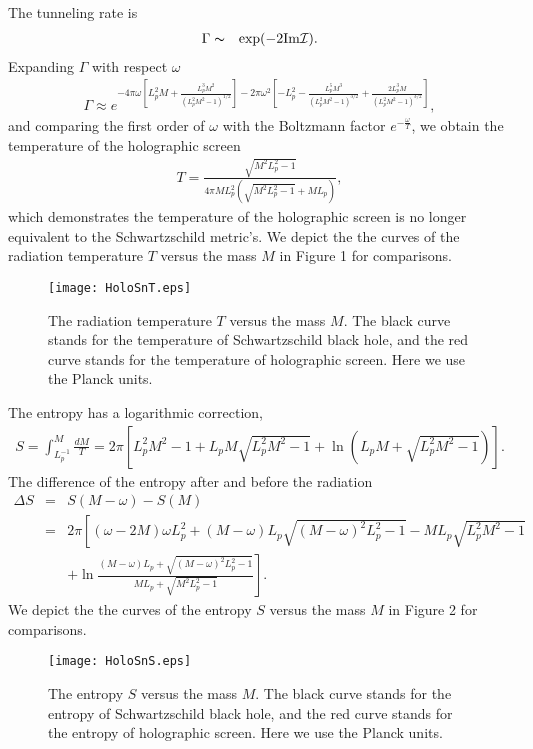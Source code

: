 \documentclass[12pt]{article}
\begin{document}
The tunneling rate is
\begin{eqnarray}
\Gamma  &\thicksim& \exp(-2 {\rm Im}{\cal I}).
 \end{eqnarray}
Expanding $\Gamma$ with respect $\omega$
\begin{eqnarray}
\Gamma  \approx   e^{-4\pi \omega \left[ L_p^2 M+\frac{ L_p^3 M^2}{\left(L_p^2 M^2-1\right)^{1/2}}\right]-2\pi  \omega^2 \left[-L_p^2-\frac{L_p^5 M^3}{\left(L_p^2 M^2-1\right)^{3/2}}+\frac{2 L_p^3 M}{\left(L_p^2 M^2-1\right)^{3/2}}\right]},
\end{eqnarray}
and comparing the first order of $\omega$ with the Boltzmann factor $e^{-\frac{\omega}{T}}$, we obtain the temperature of the holographic screen
\begin{eqnarray}
T=\frac{\sqrt{M^2 L_p^2 - 1}}{4 \pi M L_p^2 \left(\sqrt{M^2 L_p^2 - 1}+M L_p \right)},
\end{eqnarray}
which  demonstrates the temperature of the holographic screen is no longer equivalent to the Schwartzschild metric's.
We depict the the curves of the radiation temperature $T$ versus the mass $M$ in Figure 1 for comparisons.
\begin{figure}[htbp]
\begin{center}
\texttt{[image: HoloSnT.eps]}
\caption{The  radiation temperature $T$ versus the mass $M$. The black curve stands for the temperature of Schwartzschild black hole, and  the red
curve stands for the temperature of holographic screen.  Here we use the Planck units. }
\label{default}
\end{center}
\end{figure}
The entropy has a logarithmic correction,
\begin{eqnarray}
S = \int_{L_p^{-1}}^{M} \frac{dM}{T}= 2\pi  \left[ L_p^2 M^2-1 +L_p M \sqrt{L_p^2 M^2 -1}+ \ln\left( L_p M + \sqrt{ L_p^2 M^2 -1}\right)\right].
\end{eqnarray}
The difference of the entropy after and before the radiation
\begin{eqnarray}
\Delta S &=& S(M-\omega) - S(M)   \nonumber \\
&=& 2\pi  \left[  (\omega  - 2 M)\omega L_p^2 +  (M-\omega)L_p \sqrt{ (M-\omega)^2 L_p^2 -1}- M L_p \sqrt{L_p^2 M^2 -1}\right. \nonumber \\
& &\left. + \ln\frac{ (M-\omega) L_p  + \sqrt{(M-\omega)^2 L_p^2 -1}}{  M L_p + \sqrt{  M^2 L_p^2  -1}}\right].
\end{eqnarray}
We depict the the curves of the entropy $S$ versus the mass $M$ in Figure 2 for comparisons.
\begin{figure}[htbp]
\begin{center}
\texttt{[image: HoloSnS.eps]}
\caption{The  entropy $S$ versus the mass $M$. The black curve stands for the entropy of Schwartzschild black hole, and  the red curve stands for the entropy of holographic screen.  Here we use the Planck units. }
\label{default}
\end{center}
\end{figure}
\end{document}
